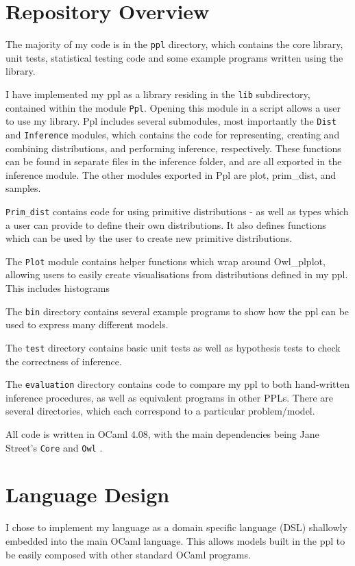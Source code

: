 \section{Repository Overview}

The majority of my code is in the \texttt{ppl} directory, which contains the core library, unit tests, statistical testing code and some example programs written using the library.

I have implemented my ppl as a library residing in the \texttt{lib} subdirectory, contained within the module \texttt{Ppl}. Opening this module in a script allows a user to use my library. Ppl includes several submodules, most importantly the \texttt{Dist} and \texttt{Inference} modules, which contains the code for representing, creating and combining distributions, and performing inference, respectively. These functions can be found in separate files in the inference folder, and are all exported in the inference module. The other modules exported in Ppl are plot, prim\_dist, and samples.

\texttt{Prim\_dist} contains code for using primitive distributions - as well as types which a user can provide to define their own distributions. It also defines functions which can be used by the user to create new primitive distributions.

The \texttt{Plot} module contains helper functions which wrap around Owl\_plplot, allowing users to easily create visualisations from distributions defined in my ppl. This includes histograms 

The \texttt{bin} directory contains several example programs to show how the ppl can be used to express many different models. 

The \texttt{test} directory contains basic unit tests as well as hypothesis tests to check the correctness of inference.

The \texttt{evaluation} directory contains code to compare my ppl to both hand-written inference procedures, as well as equivalent programs in other PPLs. There are several directories, which each correspond to a particular problem/model.

All code is written in OCaml 4.08, with the main dependencies being Jane Street's \texttt{Core} and \texttt{Owl} \cite{owl}.

\section{Language Design}
I chose to implement my language as a domain specific language (DSL) shallowly embedded into the main OCaml language. This allows models built in the ppl to be easily composed with other standard OCaml programs.

